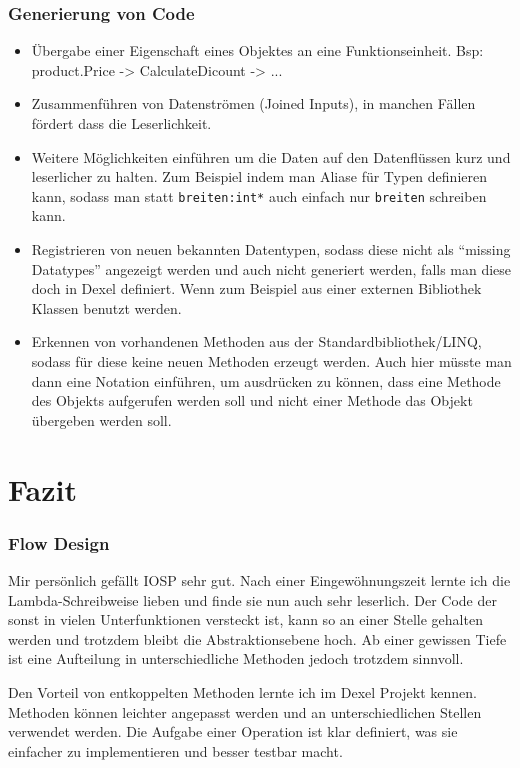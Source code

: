 \subsubsection{Generierung von Code}
\begin{itemize}
	\item Übergabe einer Eigenschaft eines Objektes an eine Funktionseinheit.
	Bsp: product.Price -> CalculateDicount -> ...				 
	\item Zusammenführen von Datenströmen (Joined Inputs), in manchen Fällen fördert dass die Leserlichkeit.
	\item Weitere Möglichkeiten einführen um die Daten auf den Datenflüssen kurz und leserlicher zu halten.
	Zum Beispiel indem man  Aliase für Typen definieren kann, sodass man statt \texttt{breiten:int*} auch einfach nur \texttt{breiten} schreiben kann. 
	\item Registrieren  von neuen bekannten Datentypen, sodass diese nicht als \enquote{missing Datatypes} angezeigt werden und auch nicht 
	generiert werden, falls man diese doch in Dexel definiert.
	Wenn zum Beispiel aus einer externen Bibliothek  Klassen benutzt werden.
	\item Erkennen von vorhandenen Methoden aus der Standardbibliothek/LINQ, sodass für diese keine neuen Methoden erzeugt werden.
	Auch hier müsste man dann eine Notation einführen, um ausdrücken zu können, dass eine Methode des Objekts aufgerufen werden soll und nicht einer Methode das Objekt übergeben werden soll.	
\end{itemize}


\section{Fazit}

\subsubsection{Flow Design}
Mir persönlich gefällt IOSP sehr gut. Nach einer Eingewöhnungszeit lernte ich die Lambda-Schreibweise lieben und finde sie nun auch sehr leserlich. Der Code der sonst in vielen Unterfunktionen versteckt ist, kann so an einer Stelle gehalten werden und trotzdem bleibt die Abstraktionsebene hoch. Ab einer gewissen Tiefe ist eine Aufteilung in unterschiedliche Methoden jedoch trotzdem sinnvoll.

Den Vorteil von entkoppelten Methoden lernte ich im Dexel Projekt kennen. Methoden können leichter angepasst werden und an unterschiedlichen Stellen verwendet werden. Die Aufgabe einer Operation ist klar definiert, was sie einfacher zu implementieren und besser testbar macht. 

